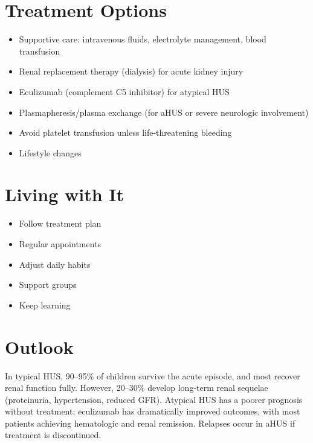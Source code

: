 \section{Treatment Options}
\begin{itemize}[noitemsep]
  \item Supportive care: intravenous fluids, electrolyte management, blood transfusion
  \item Renal replacement therapy (dialysis) for acute kidney injury
  \item Eculizumab (complement C5 inhibitor) for atypical HUS
  \item Plasmapheresis/plasma exchange (for aHUS or severe neurologic involvement)
  \item Avoid platelet transfusion unless life-threatening bleeding
  \item Lifestyle changes
\end{itemize}

\section{Living with It}
\begin{itemize}[noitemsep]
  \item Follow treatment plan
  \item Regular appointments
  \item Adjust daily habits
  \item Support groups
  \item Keep learning
\end{itemize}

\section{Outlook}
In typical HUS, 90--95\% of children survive the acute episode, and most recover renal function fully. However, 20--30\% develop long-term renal sequelae (proteinuria, hypertension, reduced GFR). Atypical HUS has a poorer prognosis without treatment; eculizumab has dramatically improved outcomes, with most patients achieving hematologic and renal remission. Relapses occur in aHUS if treatment is discontinued.
